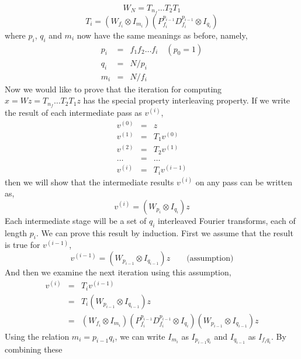 \documentclass[fleqn,12pt]{article}
\begin{document}
%
\begin{equation}
W_N = T_{n_f} \dots T_2 T_1
\end{equation}
%
\begin{equation}
T_i = (W_{f_i} \otimes I_{m_i}) 
        (P^{p_{i-1}}_{f_i} D^{p_{i-1}}_{f_i} \otimes I_{q_i})
\end{equation}
%
where $p_i$, $q_i$ and $m_i$ now have the same meanings as before,
namely,
%
\begin{eqnarray}
p_i &=& f_1 f_2 \dots f_i \quad (p_0 = 1)  \\
q_i &=& N / p_i \\
m_i &=& N / f_i 
\end{eqnarray}
%
Now we would like to prove that the iteration for computing $x = W z =
T_{n_f} \dots T_2 T_1 z$ has the special property interleaving
property. If we write the result of each intermediate pass as
$v^{(i)}$,
%
\begin{eqnarray}
v^{(0)} &=& z \\
v^{(1)} &=& T_1 v^{(0)} \\
v^{(2)} &=& T_2 v^{(1)} \\
\dots   &=& \dots \\
v^{(i)} &=& T_i v^{(i-1)} 
\end{eqnarray}
%
then we will show that the intermediate results $v^{(i)}$ on any pass
can be written as,
%
\begin{equation}
v^{(i)} = (W_{p_i} \otimes I_{q_i}) z
\end{equation}
%
Each intermediate stage will be a set of $q_i$ interleaved Fourier
transforms, each of length $p_i$. We can prove this result by
induction. First we assume that the result is true for $v^{(i-1)}$,
%
\begin{equation}
v^{(i-1)} = (W_{p_{i-1}} \otimes I_{q_{i-1}}) z \qquad \mbox{(assumption)}
\end{equation}
%
And then we examine the next iteration using this assumption,
%
\begin{eqnarray}
v^{(i)} &=& T_i v^{(i-1)} \\
        &=& T_i (W_{p_{i-1}} \otimes I_{q_{i-1}}) z \\
        &=& (W_{f_i} \otimes I_{m_i}) 
                (P^{p_{i-1}}_{f_i} D^{p_{i-1}}_{f_i} \otimes I_{q_i})
                (W_{p_{i-1}} \otimes I_{q_{i-1}}) z \label{dit-induction}
\end{eqnarray}
%
Using the relation $m_i = p_{i-1} q_i$, we can write $I_{m_i}$ as
$I_{p_{i-1} q_i}$ and $I_{q_{i-1}}$ as $I_{f_i q_i}$. By combining these
\end{document}
